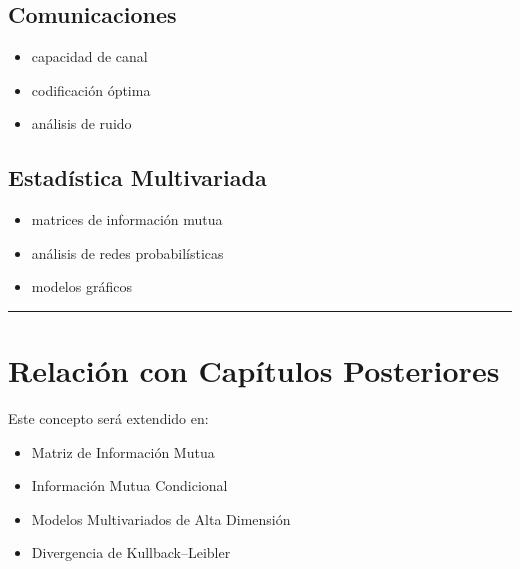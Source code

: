 \documentclass[letterpaper,10pt,english]{jupyterBook}
\begin{document}
\subsection{Comunicaciones}
\label{\detokenize{01_theory/mutual_information:comunicaciones}}\begin{itemize}
\item {} 
\sphinxAtStartPar
capacidad de canal

\item {} 
\sphinxAtStartPar
codificación óptima

\item {} 
\sphinxAtStartPar
análisis de ruido

\end{itemize}


\subsection{Estadística Multivariada}
\label{\detokenize{01_theory/mutual_information:estadistica-multivariada}}\begin{itemize}
\item {} 
\sphinxAtStartPar
matrices de información mutua

\item {} 
\sphinxAtStartPar
análisis de redes probabilísticas

\item {} 
\sphinxAtStartPar
modelos gráficos

\end{itemize}


\bigskip\hrule\bigskip



\section{Relación con Capítulos Posteriores}
\label{\detokenize{01_theory/mutual_information:relacion-con-capitulos-posteriores}}
\sphinxAtStartPar
Este concepto será extendido en:
\begin{itemize}
\item {} 
\sphinxAtStartPar
Matriz de Información Mutua

\item {} 
\sphinxAtStartPar
Información Mutua Condicional

\item {} 
\sphinxAtStartPar
Modelos Multivariados de Alta Dimensión

\item {} 
\sphinxAtStartPar
Divergencia de Kullback–Leibler

\end{itemize}
\end{document}
